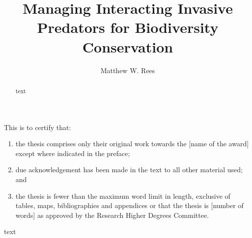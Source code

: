 \documentclass[11pt,a4paper,titlepage,twoside,openright]{style/unimelbthesis}
\title{Managing Interacting Invasive Predators for Biodiversity Conservation}
\author{Matthew W. Rees}
\begin{document}
\begin{frontmatter}


  \maketitle

  \begin{abstract}
    text
  \end{abstract}
  \begin{declaration}
    This is to certify that:
    \begin{enumerate}
    \def\labelenumi{\roman{enumi}.}
    \tightlist
    \item
      the thesis comprises only their original work towards the {[}name of
      the award{]} except where indicated in the preface;
    \item
      due acknowledgement has been made in the text to all other material
      used; and
    \item
      the thesis is fewer than the maximum word limit in length, exclusive of
      tables, maps, bibliographies and appendices or that the thesis is {[}number
      of words{]} as approved by the Research Higher Degrees Committee.
    \end{enumerate}
  \end{declaration}
  \begin{preface}
    text
  \end{preface}
  \begin{acknowledgements}

\end{acknowledgements}
\end{frontmatter}
\end{document}
